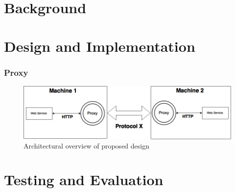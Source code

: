 \documentclass[USenglish]{article}
\begin{document}
\part{Background}

\part{Design and Implementation}
\section{Proxy}
\begin{figure}[h]
\includegraphics[scale=0.4]{images/architecture.png}
\caption{Architectural overview of proposed design}
\end{figure}


\part{Testing and Evaluation}
\end{document}
